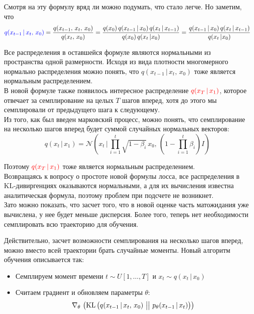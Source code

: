 \documentclass[12pt]{article}
\theoremstyle{definition} %
\theoremstyle{plain} %
\theoremstyle{remark} %
\begin{document}
        Смотря на эту формулу вряд ли можно подумать, что стало легче. Но заметим, что
        \[
        \textcolor{blue}{q(x_{t-1} \, | \, x_t,\, x_0)} = \frac{q(x_{t-1}, \, x_t,\, x_0)}{q(x_t,\, x_0)} = \frac{q(x_0) \, q(x_{t-1} \, | \, x_0) \, q(x_t \, | \, x_{t-1})}{q(x_0) \, q(x_t \, | x_0)} = \frac{q(x_{t-1} \, | \, x_0) \, q(x_t \, | \, x_{t-1})}{q(x_t \, | x_0)}
        \]

        Все распределения в оставшейся формуле являются нормальными из пространства одной размерности. Исходя из вида плотности многомерного нормально распределения можно понять, что $q(x_{t-1} \, | \, x_t,\, x_0)$ тоже является нормальным распределением. \\

        В новой формуле также появилось интересное распределение $\textcolor{red}{q(x_T \, | \, x_1)}$, которое отвечает за семплирование на целых $T$ шагов вперед, хотя до этого мы семплировали от предыдущего шага к следующему. \\
        
        Из того, как был введен марковский процесс, можно понять, что семплирование на несколько шагов вперед будет суммой случайных нормальных векторов:
        \[
        {q(x_t \, | \, x_1)} = \mathcal{N}\left(x_t \, \bigg| \, \prod_{i=1}^t\sqrt{1 - \beta_i} \, x_0, \, \left(1 - \prod_{i=1}^t\beta_i\right)I\right)
        \]

        Поэтому $\textcolor{red}{q(x_T \, | \, x_1)}$ тоже является нормальным распределением. \\

        Возвращаясь к вопросу о простоте новой формулы лосса, все распределения в KL-дивиргенциях оказываются нормальными, а для их вычисления известна аналитическая формула, поэтому проблем при подсчете не возникнет. \\

        Зато можно показать, что засчет того, что в новой оценке часть матожидания уже вычислена, у нее будет меньше дисперсия. Более того, теперь нет необходимости семплировать всю траекторию для обучения.

        \pagebreak

        Действительно, засчет возможности семплирования на несколько шагов вперед, можно вместо всей траектории брать случайные моменты. Новый алгоритм обучения описывается так:
        \begin{itemize}
            \item Семплируем момент времени $t \sim U[1, \dots, T]$ и $x_t \sim q(x_t \, | \, x_0)$
            \item Считаем градиент и обновляем параметры $\theta$:
            \[
            \nabla_\theta \, \left(\text{KL}\left(\textcolor{black}{q(x_{t-1} \, | \, x_t,\, x_0)}\,\, \big|\big| \,\, p_\theta(x_{t-1} \, | \, x_t)\right)\right)
            \]
        \end{itemize}
\end{document}
